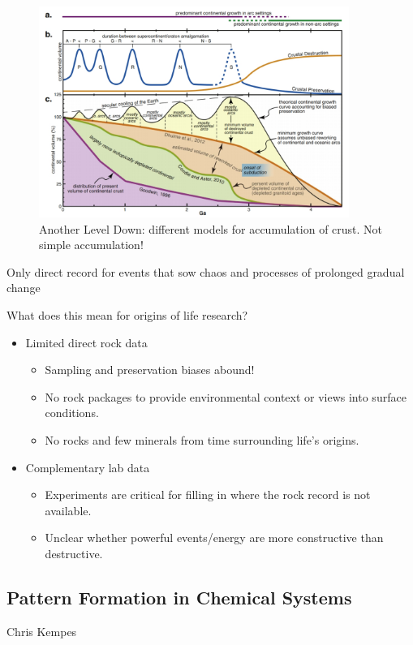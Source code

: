 \documentclass[]{article}
\begin{document}
\begin{figure}[H]
	\caption{Another Level Down: different models for accumulation of crust. Not simple accumulation!}\label{fig:AnotherLevelDown} 
	\includegraphics[width=0.9\textwidth]{AnotherLevelDown}
\end{figure}

Only direct record for events that sow chaos and processes of prolonged gradual change

What does this mean for origins of life research?
\begin{itemize}
	\item Limited direct rock data
	\begin{itemize}
		\item 	Sampling and preservation
		biases abound!
			\item No rock packages to
		provide environmental
		context or views into surface
		conditions.
		\item 	No rocks and few minerals
		from time surrounding life’s
		origins.
	\end{itemize}
	\item Complementary lab data
	\begin{itemize}
		\item Experiments are critical for
		filling in where the rock
		record is not available.
			\item Unclear whether powerful
		events/energy are more
		constructive than destructive.
	\end{itemize}
\end{itemize}
\subsection{Pattern Formation in Chemical Systems}
Chris Kempes
\end{document}
